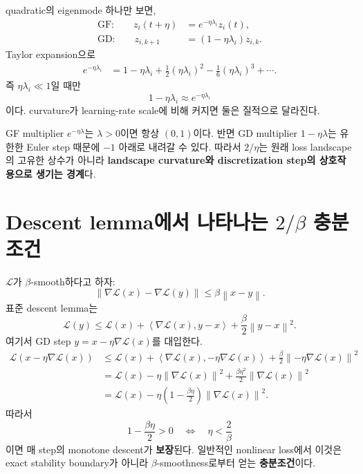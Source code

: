 \documentclass[11pt,a4paper,oneside,openany]{memoir}
\newcommand{\Loss}{\mathcal{L}}
\newcommand{\grad}{\nabla}
\newcommand{\inner}[2]{\left\langle #1,#2\right\rangle}
\newcommand{\norm}[1]{\left\lVert #1\right\rVert}
\theoremstyle{definition}
\begin{document}
quadratic의 eigenmode 하나만 보면,
\begin{align}
  \text{GF:}\qquad z_i(t+\eta)
  &=e^{-\eta\lambda_i}z_i(t),\\
  \text{GD:}\qquad z_{i,k+1}
  &=(1-\eta\lambda_i)z_{i,k}.
\end{align}
Taylor expansion으로
\begin{align}
  e^{-\eta\lambda_i}
  &=1-\eta\lambda_i+\frac12(\eta\lambda_i)^2
  -\frac16(\eta\lambda_i)^3+\cdots.
\end{align}
즉 $\eta\lambda_i\ll1$일 때만
\begin{equation}
  1-\eta\lambda_i\approx e^{-\eta\lambda_i}
\end{equation}
이다. curvature가 learning-rate scale에 비해 커지면 둘은 질적으로 달라진다.

\begin{suppbox}
GF multiplier $e^{-\eta\lambda}$는 $\lambda>0$이면 항상 $(0,1)$이다.
반면 GD multiplier $1-\eta\lambda$는 유한한 Euler step 때문에 $-1$ 아래로 내려갈 수 있다.
따라서 $2/\eta$는 원래 loss landscape의 고유한 상수가 아니라
\textbf{landscape curvature와 discretization step의 상호작용으로 생기는 경계}다.
\end{suppbox}

\section{Descent lemma에서 나타나는 \texorpdfstring{$2/\beta$}{2/beta} 충분조건}

$\Loss$가 $\beta$-smooth하다고 하자:
\begin{equation}
  \norm{\grad\Loss(x)-\grad\Loss(y)}\le\beta\norm{x-y}.
\end{equation}
표준 descent lemma는
\begin{equation}
  \Loss(y)\le \Loss(x)+\inner{\grad\Loss(x)}{y-x}
  +\frac{\beta}{2}\norm{y-x}^2.
\end{equation}
여기서 GD step $y=x-\eta\grad\Loss(x)$를 대입한다.
\begin{align}
  \Loss(x-\eta\grad\Loss(x))
  &\le \Loss(x)
  +\inner{\grad\Loss(x)}{-\eta\grad\Loss(x)}
  +\frac{\beta}{2}\norm{-\eta\grad\Loss(x)}^2\\
  &=\Loss(x)-\eta\norm{\grad\Loss(x)}^2
  +\frac{\beta\eta^2}{2}\norm{\grad\Loss(x)}^2\\
  &=\Loss(x)-\eta\left(1-\frac{\beta\eta}{2}\right)
  \norm{\grad\Loss(x)}^2.
\end{align}
따라서
\begin{equation}
  1-\frac{\beta\eta}{2}>0
  \quad\Longleftrightarrow\quad
  \eta<\frac{2}{\beta}
\end{equation}
이면 매 step의 monotone descent가 \textbf{보장}된다. 일반적인 nonlinear loss에서 이것은 exact stability boundary가 아니라
$\beta$-smoothness로부터 얻는 \textbf{충분조건}이다.
\end{document}
